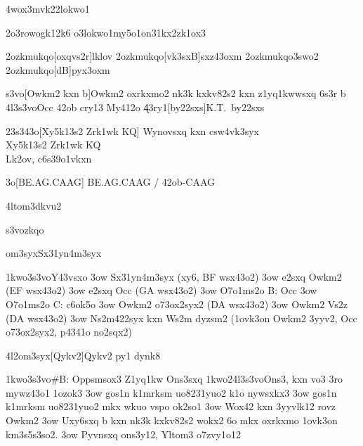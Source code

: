 \nym4wox3mvk22{lokwo1}

{
  \42o3rowo{gk12k6}
  \2o3lokwo1my5o1on{31kx2zk1ox3}
}


\42ozkmukqo[oxqvs2r]{lklov}
\42ozkmukqo[vk3sxB]{sxz43oxm}
\42ozkmukqo{3swo2}
\42ozkmukqo[dB]{pyx3oxm}


\3s3vo[Owkm2 kxn b]{Owkm2 oxrkxmo2 nk3k kxkv82s2 kxn z1yq1kwwsxq 6s3r b}
\24l3s3vo{Occ 42ob cry13 My412o} 
\k43ry1[by22sxs]{K.T.~by22sxs}

\sx23s343o[Xy5k13s2 Zrk1wk KQ]
{
  Wynovsxq kxn csw4vk3syx \\
  Xy5k13s2 Zrk1wk KQ \\
  Lk2ov, c6s39o1vkxn
}

\nk3o[BE.AG.CAAG]
{BE.AG.CAAG / 42ob-CAAG}

\24ltom3{dkvu2}




  \3s3vozkqo

\2om3syx{Sx31yn4m3syx}

  \p1kwo3s3vo{Y43vsxo}
  \s3ow Sx31yn4m3syx (xy6, BF wsx43o2)
  \s3ow e2sxq Owkm2 (EF wsx43o2)
  \s3ow e2sxq Occ (GA wsx43o2)
  \s3ow O7o1ms2o B: Occ
  \s3ow O7o1ms2o C: c6ok5o
  \s3ow Owkm2 o73ox2syx2 (DA wsx43o2)
  \s3ow Owkm2 Vs2z (DA wsx43o2)
  \s3ow Ns2m422syx kxn Ws2m dyzsm2 (1ovk3on Owkm2 3yyv2, Occ o73ox2syx2, p4341o no2sqx2)

\24l2om3syx[Qykv2]{Qykv2 py1 dynk8}

  \p1kwo3s3vo{\#B: Oppsmsox3 Z1yq1kw Ons3sxq}
  \p1kwo24l3s3vo{Ons3, kxn vo3 3ro mywz43o1 1ozok3}
  \s3ow gos1n k1mrksm uo8231yuo2 k1o nywsxkx3
  \s3ow gos1n k1mrksm uo8231yuo2 mkx wkuo vspo ok2so1
  \s3ow Wox42 kxn 3yyvlk12 rovz Owkm2
  \s3ow Uxy6sxq b kxn nk3k kxkv82s2 wokx2 6o mkx oxrkxmo 1ovk3on km3s5s3so2.
  \s3ow Pyvnsxq ons3y12, Yltom3 o7zvy1o12

